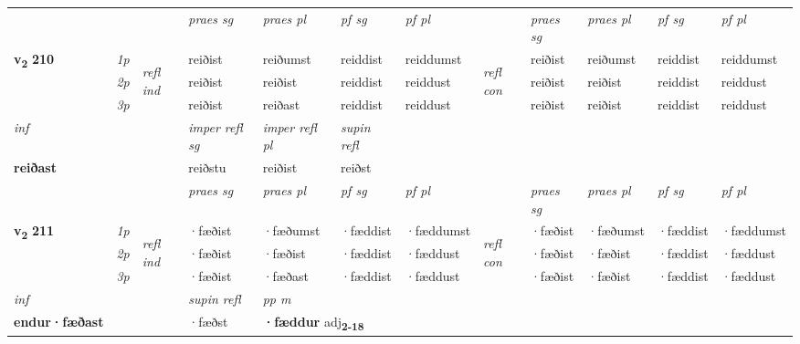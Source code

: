 \begin{longtable}[l]{X>{\footnotesize\itshape}llXXXXlXXXX}
 & &   & \textit{praes sg}  & \textit{praes pl}    & \textit{ pf sg} & \textit{pf pl} & & \textit{praes sg}  & \textit{praes pl}    & \textit{pf sg} & \textit{pf pl }  \\ \cmidrule{4-7} \cmidrule{9-12}
 \multirow{2}{*}{{{\textbf{v{\textsubscript{2}}} \Large{\textbf{210}}}}}  & 1p & \multirow{3}{*}{\begin{turn}{90}\textit{refl ind}\end{turn}}  & reiðist & reiðumst & reiddist & reiddumst & \multirow{3}{*}{\begin{turn}{90}\textit{refl con}\end{turn}}  &reiðist & reiðumst & reiddist & reiddumst \\*
 & 2p &  & reiðist & reiðist & reiddist & reiddust & &reiðist & reiðist & reiddist & reiddust \\*
 & 3p  & & reiðist & reiðast & reiddist & reiddust & & reiðist & reiðist& reiddist & reiddust \\*
\cmidrule{4-7} \cmidrule{9-12}

   {\textit{inf}} & &   & \textit{imper refl sg} & \textit{imper refl pl}   & \textit{supin refl}  \\*
  {\textbf{reiðast}} & &   & reiðstu & reiðist   & reiðst  \\*

\midrule

 & &   & \textit{praes sg}  & \textit{praes pl}    & \textit{ pf sg} & \textit{pf pl} & & \textit{praes sg}  & \textit{praes pl}    & \textit{pf sg} & \textit{pf pl }  \\ \cmidrule{4-7} \cmidrule{9-12}
 \multirow{2}{*}{{{\textbf{v{\textsubscript{2}}} \Large{\textbf{211}}}}}  & 1p & \multirow{3}{*}{\begin{turn}{90}\textit{refl ind}\end{turn}}  & ·fæðist & ·fæðumst & ·fæddist & ·fæddumst & \multirow{3}{*}{\begin{turn}{90}\textit{refl con}\end{turn}}  &·fæðist & ·fæðumst & ·fæddist & ·fæddumst \\*
 & 2p &  & ·fæðist & ·fæðist & ·fæddist & ·fæddust & &·fæðist & ·fæðist & ·fæddist & ·fæddust \\*
 & 3p  & & ·fæðist & ·fæðast & ·fæddist & ·fæddust & & ·fæðist & ·fæðist& ·fæddist & ·fæddust \\*
\cmidrule{4-7} \cmidrule{9-12}

   {\textit{inf}} & &       & \textit{supin refl} & \textit{pp m} \\*
  {\textbf{endur\allowbreak ·fæðast}} & &       & ·fæðst & \multicolumn{2}{l}{\textbf{·fæddur} adj\textbf{\textsubscript{2-18}}} \\*


\end{longtable}
